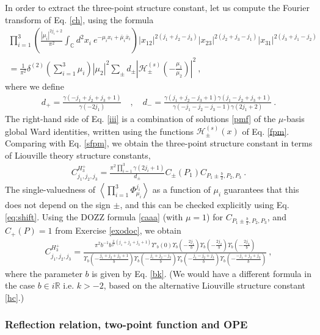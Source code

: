 \documentclass[12pt, a4paper, notitlepage, twoside]{report}
\numberwithin{equation}{section}
\theoremstyle{break}
\begin{document}
In order to extract the three-point structure constant, let us compute the Fourier transform of Eq. \eqref{ch}, using the formula \cite{rt05}
\begin{multline}
 \prod_{i=1}^3\left(\frac{|\mu_i|^{2j_i+2}}{\pi^2}\int_{{\mathbb{C}}}d^2x_i\ e^{-\mu_ix_i+\bar{\mu}_i\bar{x}_i}\right)
|x_{12}|^{2(j_1+j_2-j_3)} |x_{23}|^{2(j_2+j_3-j_1)} |x_{31}|^{2(j_3+j_1-j_2)} 
\\
= \frac{1}{\pi^2}\delta^{(2)}(\textstyle{\sum}_{i=1}^3\mu_i)|\mu_2|^2 \sum_\pm d_\pm \left|\mathcal{H}^{(s)}_\pm(-\tfrac{\mu_1}{\mu_2})\right|^2 \ ,
\label{iii}
\end{multline}
where we define 
\begin{align}
 d_+ = \frac{\gamma(-j_1+j_2+j_3+1)}{\gamma(-2j_1)} \quad , \quad d_- = \frac{\gamma(j_1+j_2-j_3+1)\gamma(j_1-j_2+j_3+1)}{\gamma(-j_1-j_2-j_3-1)\gamma(2j_1+2)}\ .
\end{align}
The right-hand side of Eq. \eqref{iii} is a combination of solutions \eqref{pmf} of the $\mu$-basis global Ward identities, written using the functions $\mathcal{H}^{(s)}_\pm(x)$ of Eq. \eqref{fpm}.
Comparing with Eq. \eqref{sfpm}, we obtain the three-point structure constant in terms of Liouville theory structure constants,
\begin{align}
 C^{H_3^+}_{j_1,j_2,j_3} = \frac{\pi^2\prod_{i=1}^3\gamma(2j_i+1)}{d_\pm}C_{\pm}(P_1)C_{P_1\pm \frac{b}{2},P_2,P_3}\ .
\end{align}
The single-valuedness of $\left\langle \prod_{i=1}^3\Phi^{j_i}_{\mu_i} \right\rangle $ as a function of $\mu_i$ guarantees that this does not depend on the sign $\pm$, and this can be checked explicitly using Eq. \eqref{eq:shift}. 
Using the DOZZ formula \eqref{caaa} (with $\mu=1$) for $C_{P_1\pm \frac{b}{2},P_2,P_3}$, and $C_+(P)=1$ from Exercise \ref{exodoc}, we obtain
\begin{align}
\boxed{C^{H_3^+}_{j_1,j_2,j_3} = \frac{\pi^2b^{-1}b^{\frac{2}{b^2}(j_1+j_2+j_3+1)} \Upsilon'_b(0)\Upsilon_b(-\frac{2j_1}{b})\Upsilon_b(-\frac{2j_2}{b})\Upsilon_b(-\frac{2j_3}{b})}
{\Upsilon_b(-\frac{j_1+j_2+j_3+1}{b})\Upsilon_b(-\frac{j_1+j_2-j_3}{b}) \Upsilon_b(-\frac{j_1-j_2+j_3}{b})\Upsilon_b(-\frac{-j_1+j_2+j_3}{b})}}\ ,
\label{chp}
\end{align}
where the parameter $b$ is given by Eq. \eqref{bk}.
(We would have a different formula in the case $b\in i\mathbb{R}$ i.e. $k>-2$, based on the alternative Liouville structure constant \eqref{hc}.)


\subsubsection{Reflection relation, two-point function and OPE}
\end{document}
